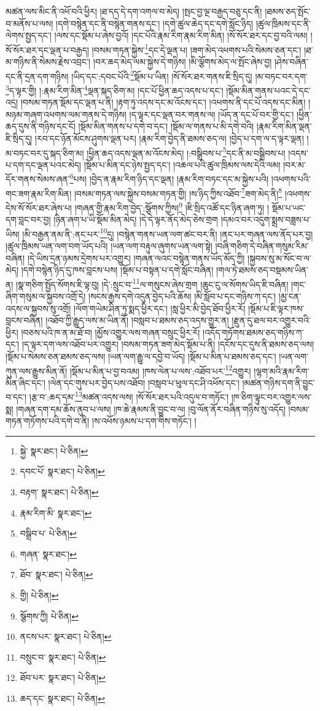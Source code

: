 མཚན་ལས་མིང་ནི་འཕོ་བའི་ཕྱིར། །ཐ་དད་དེ་དག་འགལ་བ་མེད། །སྤང་བྱ་ལྔ་བརྒྱད་བཅུ་དང་ནི། །ཐམས་ཅད་སྤོང་བ་མནོས་པ་ལས། །དགེ་བསྙེན་དང་ནི་བསྙེན་གནས་དང་། །དགེ་ཚུལ་ཆེད་དང་དགེ་སློང་ཉིད། །ཚུལ་ཁྲིམས་དང་ནི་ལེགས་སྤྱད་དང་། །ལས་དང་སྡོམ་པ་ཞེས་བྱའོ། །དང་པོའི་རྣམ་རིག་རྣམ་རིག་མིན། །སོ་སོར་ཐར་དང་བྱ་བའི་ལམ། །སོ་སོར་ཐར་དང་ལྡན་པ་བརྒྱད། །བསམ་གཏན་སྐྱེས་\footnote{སྐྱེ་  སྣར་ཐང་།  པེ་ཅིན། }དང་དེ་ལྡན་པ། །ཟག་མེད་འཕགས་པའི་སེམས་ཅན་དང་། །ཐ་མ་གཉིས་ནི་སེམས་རྗེས་འབྲང་། །བར་ཆད་མེད་ལམ་སྐྱེས་དེ་གཉིས། །མི་ལྕོགས་མེད་ལ་སྤོང་ཞེས་བྱ། །ཤེས་བཞིན་དང་ནི་དྲན་དག་གཉིས། །ཡིད་དང་:དབང་པོའི་\footnote{དབང་པོ་  སྣར་ཐང་།  པེ་ཅིན། }སྡོམ་པ་ཡིན། །སོ་སོར་ཐར་གནས་ཇི་སྲིད་དུ། །མ་བཏང་བར་དག་\footnote{བརྟག་  སྣར་ཐང་།  པེ་ཅིན། }ད་ལྟར་གྱི། །:རྣམ་རིག་མིན་\footnote{རྣམ་རིག་མི་  སྣར་ཐང་། }ལྡན་སྐད་ཅིག་མ། །དང་པོ་ཕྱིན་ཆད་འདས་པ་དང་། །སྡོམ་མིན་གནས་པའང་དེ་དང་འདྲ། །བསམ་གཏན་སྡོམ་དང་ལྡན་པ་ནི། །རྟག་ཏུ་འདས་དང་མ་འོངས་དང་། །འཕགས་ནི་དང་པོ་འདས་དང་མིན། །མཉམ་གཞག་འཕགས་ལམ་གནས་དེ་གཉིས། །ད་ལྟར་དང་ལྡན་བར་གནས་ལ། །ཡོད་ན་དང་པོ་བར་གྱི་དང་། །ཕྱིན་ཆད་དུས་ནི་གཉིས་དང་ངོ། །སྡོམ་མིན་གནས་པ་དགེ་བ་དང་། །སྡོམ་ལ་གནས་པ་མི་དགེ་བའི། །རྣམ་རིག་མིན་ལྡན་ཇི་སྲིད་དུ། །རབ་དང་ཉོན་མོངས་ཤུགས་ལྡན་པར། །རྣམ་རིག་བྱེད་ནི་ཐམས་ཅད་ལ། །བྱེད་པ་དག་ལ་ད་ལྟར་ལྡན། །མ་བཏང་བར་དུ་སྐད་ཅིག་མ། །ཕྱིན་ཆད་འདས་ལྡན་མ་འོངས་མེད། །:བསྒྲིབས་པ་\footnote{བསྒྲིབ་པ་  པེ་ཅིན། }དང་ནི་མ་བསྒྲིབས་པ། །འདས་པ་དག་དང་ལྡན་པའང་མེད། །སྡོམ་པ་མིན་དང་ཉེས་སྤྱད་དང་། །འཆལ་པའི་ཚུལ་ཁྲིམས་ལས་དེའི་ལམ། །བར་མ་དོར་གནས་སེམས་ཞན་\footnote{གཞན་  སྣར་ཐང་། }པས། །བྱེད་ན་རྣམ་རིག་ཉིད་དང་ལྡན། །རྣམ་རིག་བཏང་དང་མ་སྐྱེས་པའི། །འཕགས་པའི་གང་ཟག་རྣམ་རིག་མིན། །བསམ་གཏན་ལས་སྐྱེས་བསམ་གཏན་གྱི། །ས་ཉིད་ཀྱིས་འཐོབ་\footnote{ཐོབ་  སྣར་ཐང་།  པེ་ཅིན། }ཟག་མེད་ནི།\footnote{གྱི།  པེ་ཅིན། } །འཕགས་དེས་སོ་སོར་ཐར་ཞེས་པ། །གཞན་གྱི་རྣམ་རིག་བྱེད་:སྩོགས་ཀྱིས།\footnote{སྩོགས་ཀྱི།  པེ་ཅིན། } །ཇི་སྲིད་འཚོ་དང་ཉིན་ཞག་ཏུ། །
སྡོམ་པ་ཡང་དག་བླང་བར་བྱ། །ཉིན་ཞག་པ་ཡི་སྡོམ་མིན་མེད། །དེ་དེ་ལྟར་ནོད་མེད་ཅེས་གྲག །དམའ་བར་འདུག་སྨྲས་བཟླས་པ་ཡིས། །མི་བརྒྱན་ནམ་ནི་:ནང་པར་\footnote{ནངས་པར་  སྣར་ཐང་།  པེ་ཅིན། }དུ། །བསྙེན་གནས་ཡན་ལག་ཚང་བར་ནི། །ནང་པར་གཞན་ལས་ནོད་པར་བྱ། །ཚུལ་ཁྲིམས་ཡན་ལག་བག་ཡོད་པའི། །ཡན་ལག་བརྟུལ་ཞུགས་ཡན་ལག་སྟེ། །བཞི་གཅིག་དེ་བཞིན་གསུམ་རིམ་བཞིན། །དེ་ཡིས་དྲན་ཉམས་དྲེགས་པར་འགྱུར། །གཞན་ལའང་བསྙེན་གནས་ཡོད་མོད་ཀྱི། །སྐྱབས་སུ་མ་སོང་བ་ལ་མེད། །དགེ་བསྙེན་ཉིད་དུ་ཁས་བླངས་པས། །སྡོམ་པ་བསྟན་པ་དགེ་སློང་བཞིན། །གལ་ཏེ་ཐམས་ཅད་བསྡམས་ཡིན་ན། །སྣ་གཅིག་སྤྱོད་སོགས་ཇི་ལྟ་བུ། །དེ་:སྲུང་བ་\footnote{བསྲུང་བ་  སྣར་ཐང་།  པེ་ཅིན། }ལ་གསུངས་ཞེས་གྲག །ཆུང་ངུ་ལ་སོགས་ཡིད་ཇི་བཞིན། །གང་ཞིག་གསུམ་ལ་སྐྱབས་འགྲོ་དེ། །སངས་རྒྱས་དགེ་འདུན་བྱེད་པའི་ཆོས། །མི་སློབ་པ་དང་གཉིས་ཀ་དང་། །མྱ་ངན་འདས་ལ་སྐྱབས་སུ་འགྲོ། །ལོག་གཡེམ་ཤིན་ཏུ་སྨད་ཕྱིར་དང་། །སླ་ཕྱིར་མི་བྱེད་ཐོབ་ཕྱིར་རོ། །སྡོམ་པ་ཇི་ལྟར་ཁས་བླངས་བཞིན། །འཐོབ་ཀྱི་རྒྱུད་ལས་མ་ཡིན་ནོ། །བསླབ་པ་ཐམས་ཅད་འདས་གྱུར་ན། །རྫུན་དུ་ཐལ་བར་འགྱུར་བའི་ཕྱིར། །བཅས་པའི་ཁ་ན་མ་ཐོ་བ། །མྱོས་འགྱུར་ལས་གཞན་བསྲུང་ཕྱིར་རོ། །འདོད་གཏོགས་ཐམས་ཅད་གཉིས་ཀ་དང་། །ད་ལྟར་དག་ལས་འཐོབ་པར་འགྱུར། །བསམ་གཏན་ཟག་མེད་སྡོམ་པ་ནི། །དངོས་དང་དུས་ནི་ཐམས་ཅད་ལས། །སྡོམ་པ་སེམས་ཅན་ཐམས་ཅད་ལས། །ཡན་ལག་རྒྱུ་ལ་དབྱེ་བ་ཡོད། །སྡོམ་པ་མིན་པ་ཐམས་ཅད་དང་། །ཡན་ལག་ཀུན་ལས་རྒྱུས་མིན་ནོ། །སྡོམ་པ་མིན་པ་བྱ་བའམ། །ཁས་ལེན་པ་ལས་:འཐོབ་པར་\footnote{ཐོབ་པར་  སྣར་ཐང་།  པེ་ཅིན། }འགྱུར། །ལྷག་མའི་རྣམ་རིག་མིན་ཞིང་དང་། །ལེན་དང་གུས་པར་བྱེད་པས་འཐོབ། །བསླབ་པ་ཕུལ་དང་ཤི་འཕོས་དང་། །མཚན་གཉིས་དག་ནི་བྱུང་བ་དང་། །རྩ་བ་:ཆད་དམ་\footnote{ཆད་དང་  སྣར་ཐང་།  པེ་ཅིན། }མཚན་འདས་ལས། །སོ་སོར་ཐར་པའི་འདུལ་བ་གཏོང་། །ཁ་ཅིག་ལྟུང་བར་འགྱུར་ལས་སྨ། །གཞན་དག་དམ་ཆོས་ནུབ་པ་ལས། །ཁ་ཆེ་རྣམས་ནི་བྱུང་བ་ལ། །བུ་ལོན་ནོར་བཞིན་གཉིས་སུ་འདོད། །བསམ་གཏན་གཏོགས་པའི་དགེ་བ་ནི། །ས་འཕོས་ཉམས་པ་དག་གིས་གཏོང་། །
